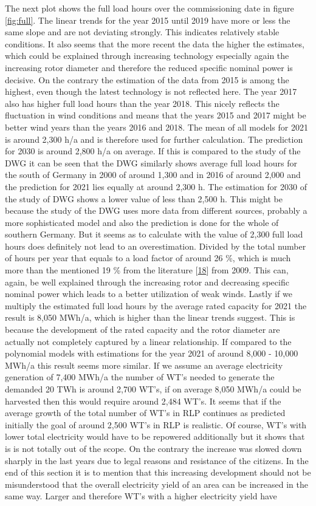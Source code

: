 \documentclass[a4paper,11pt]{article}
\begin{document}
The next plot shows the full load hours over the commissioning date in figure \ref{fig:full}. The linear trends for the year 2015 until 2019 have more or less the same slope and are not deviating strongly. This indicates relatively stable conditions. It also seems that the more recent the data the higher the estimates, which could be explained through increasing technology especially again the increasing rotor diameter and therefore the reduced specific nominal power is decisive. On the contrary the estimation of the data from 2015 is among the highest, even though the latest technology is not reflected here. The year 2017 also has higher full load hours than the year 2018. This nicely reflects the fluctuation in wind conditions and means that the years 2015 and 2017 might be better wind years than the years 2016 and 2018. The mean of all models for 2021 is around 2,300 h/a and is therefore used for further calculation. The prediction for 2030 is around 2,800 h/a on average. If this is compared to the study of the DWG it can be seen that the DWG similarly shows average full load hours for the south of Germany in 2000 of around 1,300 and in 2016 of around 2,000 and the prediction for 2021 lies equally at around 2,300 h. The estimation for 2030 of the study of DWG shows a lower value of less than 2,500 h. This might be because the study of the DWG uses more data from different sources, probably a more sophisticated model and also the prediction is done for the whole of southern Germany. But it seems as to calculate with the value of 2,300 full load hours does definitely not lead to an overestimation. Divided by the total number of hours per year that equals to a load factor of around 26 \%, which is much more than the mentioned 19 \% from the literature {[}\protect\hyperlink{ref-DavidJCMacKay.2009}{18}{]} from 2009. This can, again, be well explained through the increasing rotor and decreasing specific nominal power which leads to a better utilization of weak winds. Lastly if we multiply the estimated full load hours by the average rated capacity for 2021 the result is 8,050 MWh/a, which is higher than the linear trends suggest. This is because the development of the rated capacity and the rotor diameter are actually not completely captured by a linear relationship. If compared to the polynomial models with estimations for the year 2021 of around 8,000 - 10,000 MWh/a this result seems more similar. If we assume an average electricity generation of 7,400 MWh/a the number of WT's needed to generate the demanded 20 TWh is around 2,700 WT's, if on average 8,050 MWh/a could be harvested then this would require around 2,484 WT's. It seems that if the average growth of the total number of WT's in RLP continues as predicted initially the goal of around 2,500 WT's in RLP is realistic. Of course, WT's with lower total electricity would have to be repowered additionally but it shows that is is not totally out of the scope. On the contrary the increase was slowed down sharply in the last years due to legal reasons and resistance of the citizens. In the end of this section it is to mention that this increasing development should not be misunderstood that the overall electricity yield of an area can be increased in the same way. Larger and therefore WT's with a higher electricity yield have 
\end{document}
